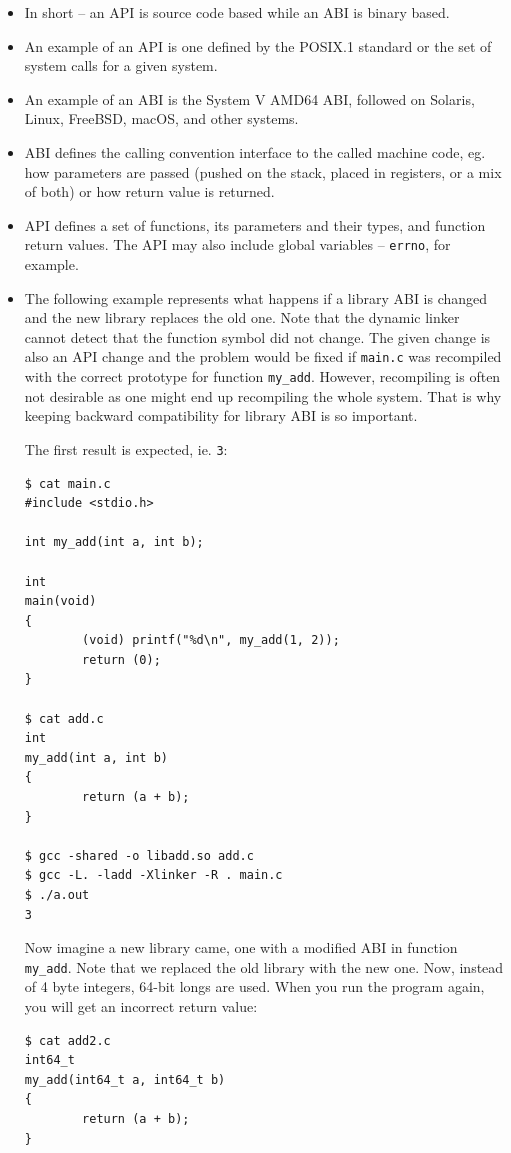\begin{itemize}
\item In short -- an API is source code based while an ABI is binary based.
\item An example of an API is one defined by the POSIX.1 standard or the set of
system calls for a given system.
\item An example of an ABI is the System V AMD64 ABI, followed on Solaris,
Linux, FreeBSD, macOS, and other systems.
\item ABI defines the calling convention interface to the called machine code, eg.
how parameters are passed (pushed on the stack, placed in registers, or a mix
of both) or how return value is returned.
\item API defines a set of functions, its parameters and their types, and
function return values.  The API may also include global variables --
\texttt{errno}, for example.
\item The following example represents what happens if a library ABI is changed
and the new library replaces the old one.  Note that the dynamic linker cannot
detect that the function symbol did not change.  The given change is also an
API change and the problem would be fixed if \texttt{main.c} was recompiled
with the correct prototype for function \texttt{my\_add}.  However,
recompiling is often not desirable as one might end up recompiling the whole
system.  That is why keeping backward compatibility for library ABI is so
important.

The first result is expected, ie. \texttt{3}:

\begin{verbatim}
$ cat main.c 
#include <stdio.h>

int my_add(int a, int b);

int
main(void)
{
        (void) printf("%d\n", my_add(1, 2));
        return (0);
}

$ cat add.c
int
my_add(int a, int b)
{
        return (a + b);
}

$ gcc -shared -o libadd.so add.c
$ gcc -L. -ladd -Xlinker -R . main.c
$ ./a.out 
3
\end{verbatim}

Now imagine a new library came, one with a modified ABI in function
\texttt{my\_add}.  Note that we replaced the old library with the new one.
Now, instead of 4 byte integers, 64-bit longs are used.  When you run the
program again, you will get an incorrect return value:

\begin{verbatim}
$ cat add2.c
int64_t
my_add(int64_t a, int64_t b)
{
        return (a + b);
}


\end{verbatim}
\end{itemize}
